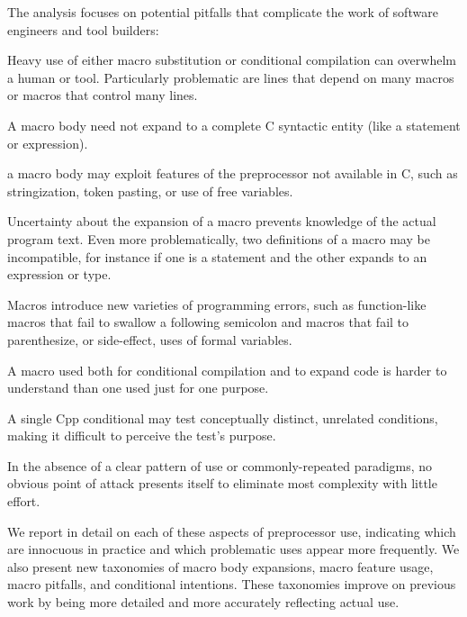 \documentclass[10pt]{article}
\begin{document}
The analysis focuses on potential pitfalls that complicate the work of
software engineers and tool builders:
\begin{description}\itemsep 0pt \parskip 0pt
\item[high total use]  Heavy use of either macro substitution or
  conditional compilation can overwhelm a human or tool.  Particularly
  problematic are lines that depend on many macros or macros that control
  many lines.
\item[complicated bodies]  A macro body need not expand to a complete
  C syntactic entity (like a statement or expression).
\item[extra-linguistic features]  a macro body may exploit features of
  the preprocessor not available in C, such as stringization, token
  pasting, or use of free variables.
\item[multiple definitions]  Uncertainty about the expansion of a macro
  prevents knowledge of the actual program text.  Even more problematically,
  two definitions of a macro may be incompatible, for instance if one is a
  statement and the other expands to an expression or type.
\item[macro pitfalls]  Macros introduce new varieties of programming
  errors, such as function-like macros that fail to swallow a following
  semicolon and macros that fail to parenthesize, or side-effect, uses of
  formal variables.
\item[inconsistent usage]  A macro used both for conditional compilation
  and to expand code is harder to understand than one used just for one
  purpose.
\item[mixed tests]  A single Cpp conditional may test conceptually
  distinct, unrelated conditions, making it difficult to perceive the
  test's purpose.
\item[variation in use]  In the absence of a clear pattern of use or
  commonly-repeated paradigms, no obvious point of attack presents itself
  to eliminate most complexity with little effort.
\end{description}

We report in detail on each of these aspects of preprocessor use,
indicating which are innocuous in practice and which problematic
uses appear more frequently.  We also present new taxonomies of macro body
expansions, macro feature usage, macro pitfalls, and conditional
intentions.  These taxonomies improve on previous work by being more
detailed and more accurately reflecting actual use.
\end{document}
